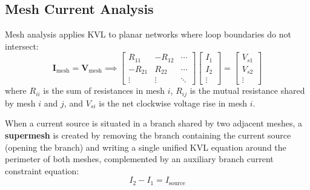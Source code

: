 \subsection{Mesh Current Analysis}
Mesh analysis applies KVL to planar networks where loop boundaries do not intersect:
\begin{equation}
[\mathbf{R}] \mathbf{I}_{\text{mesh}} = \mathbf{V}_{\text{mesh}} \implies \begin{bmatrix} R_{11} & -R_{12} & \cdots \\ -R_{21} & R_{22} & \cdots \\ \vdots & \vdots & \ddots \end{bmatrix} \begin{bmatrix} I_1 \\ I_2 \\ \vdots \end{bmatrix} = \begin{bmatrix} V_{s1} \\ V_{s2} \\ \vdots \end{bmatrix}
\end{equation}
where $R_{ii}$ is the sum of resistances in mesh $i$, $R_{ij}$ is the mutual resistance shared by mesh $i$ and $j$, and $V_{si}$ is the net clockwise voltage rise in mesh $i$.
\begin{definition}[Supermesh]
When a current source is situated in a branch shared by two adjacent meshes, a \textbf{supermesh} is created by removing the branch containing the current source (opening the branch) and writing a single unified KVL equation around the perimeter of both meshes, complemented by an auxiliary branch current constraint equation:
\begin{equation}
I_2 - I_1 = I_{\text{source}}
\end{equation}
\end{definition}

